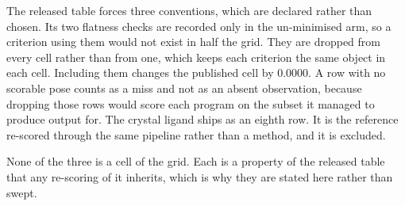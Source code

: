 The released table forces three conventions, which are declared rather than chosen. Its two flatness
checks are recorded only in the un-minimised arm, so a criterion using them would not exist in half
the grid. They are dropped from every cell rather than from one, which keeps each criterion the same
object in each cell. Including them changes the published cell by $0.0000$. A row with no
scorable pose counts as a miss and not as an absent observation, because dropping those rows would
score each program on the subset it managed to produce output for. The crystal ligand ships as an
eighth row. It is the reference re-scored through the same pipeline rather than a method, and it is
excluded.

None of the three is a cell of the grid. Each is a property of the released table that any re-scoring
of it inherits, which is why they are stated here rather than swept.
